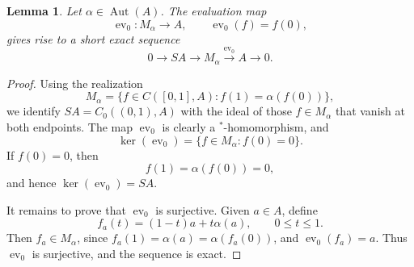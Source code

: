 \documentclass{book}
\newtheorem{lemma}[definition]{Lemma}
\begin{document}
\begin{lemma}\label{lemma:mapping-torus-exact-sequence}
  Let \(\alpha\in\operatorname{Aut}(A)\). The evaluation map
  \[
    \operatorname{ev}_0:M_\alpha\longrightarrow A,
    \qquad
    \operatorname{ev}_0(f)=f(0),
  \]
  gives rise to a short exact sequence
  \[
    0\longrightarrow SA
    \longrightarrow M_\alpha
    \xrightarrow{\operatorname{ev}_0}A
    \longrightarrow 0.
  \]
\end{lemma}

\begin{proof}
  Using the realization
  \[
    M_\alpha
    =
    \{f\in C([0,1],A):f(1)=\alpha(f(0))\},
  \]
  we identify \(SA=C_0((0,1),A)\) with the ideal of those
  \(f\in M_\alpha\) that vanish at both endpoints. The map
  \(\operatorname{ev}_0\) is clearly a \(^*\)-homomorphism, and
  \[
    \ker(\operatorname{ev}_0)
    =
    \{f\in M_\alpha:f(0)=0\}.
  \]
  If \(f(0)=0\), then
  \[
    f(1)=\alpha(f(0))=0,
  \]
  and hence \(\ker(\operatorname{ev}_0)=SA\).

  It remains to prove that \(\operatorname{ev}_0\) is surjective. Given
  \(a\in A\), define
  \[
    f_a(t)=(1-t)a+t\alpha(a),
    \qquad 0\leq t\leq1.
  \]
  Then \(f_a\in M_\alpha\), since
  \(f_a(1)=\alpha(a)=\alpha(f_a(0))\), and
  \(\operatorname{ev}_0(f_a)=a\). Thus \(\operatorname{ev}_0\) is
  surjective, and the sequence is exact.
\end{proof}
\end{document}
